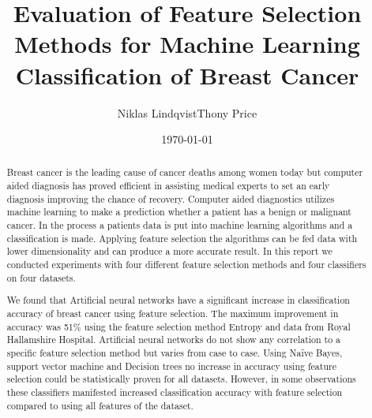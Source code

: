 \documentclass{kththesis}
\title{Evaluation of Feature Selection Methods for Machine Learning Classification of Breast Cancer}
\author{Niklas Lindqvist\newline Thony Price}
\date{\today}
\begin{document}

\frontmatter
\titlepage



\begin{abstract}

  Breast cancer is the leading cause of cancer deaths among women today but computer aided diagnosis has proved efficient in assisting medical experts to set an early diagnosis improving the chance of recovery. Computer aided diagnostics utilizes machine learning to make a prediction whether a patient has a benign or malignant cancer. In the process a patients data is put into machine learning algorithms and a classification is made. Applying feature selection the algorithms can be fed data with lower dimensionality and can produce a more accurate result. In this report we conducted experiments with four different feature selection methods and four classifiers on four datasets.

  We found that Artificial neural networks have a significant increase in classification accuracy of breast cancer using feature selection. The maximum improvement in accuracy was 51\% using the feature selection method Entropy and data from Royal Hallamshire Hospital. Artificial neural networks do not show any correlation to a specific feature selection method but varies from case to case. Using Naïve Bayes, support vector machine and Decision trees no increase in accuracy using feature selection could be statistically proven for all datasets. However, in some observations these classifiers manifested increased classification accuracy with feature selection compared to using all features of the dataset.

\end{abstract}


\end{document}
